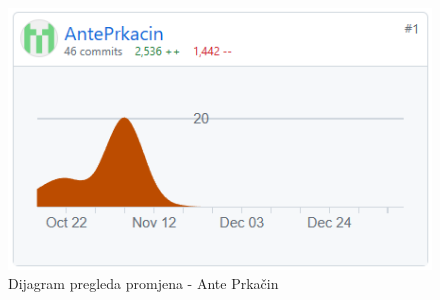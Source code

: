 		\begin{figure}[H]
			\includegraphics[scale=0.80]{slike/ante.png} %
			\centering
			\caption{Dijagram pregleda promjena - Ante Prkačin}
			\label{fig:DijagramPregledaPromjena}
		\end{figure}





